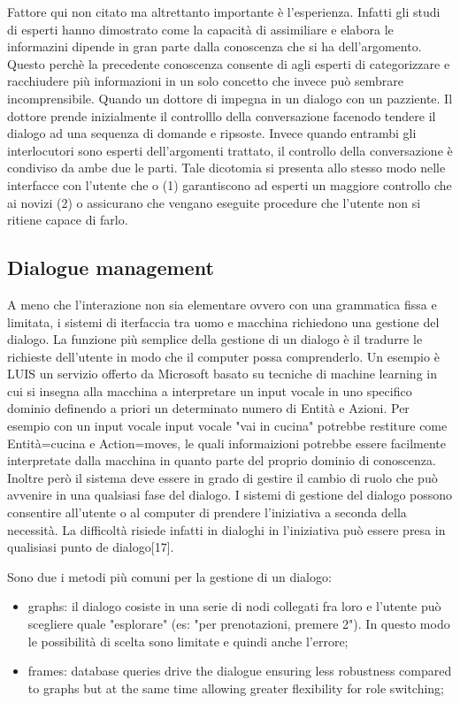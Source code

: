 \documentclass{thesisreport}
\begin{document}
 Fattore qui non citato ma altrettanto importante è l'esperienza. Infatti gli studi di esperti hanno dimostrato come la capacità di assimiliare e elabora le informazini dipende in gran parte dalla conoscenza che si ha dell'argomento. Questo perchè la precedente conoscenza consente di agli esperti di categorizzare e racchiudere più informazioni  in un solo concetto che invece può sembrare incomprensibile. 
 Quando un dottore di impegna in un dialogo con un pazziente. Il dottore prende inizialmente il controlllo della conversazione facenodo tendere il dialogo ad una sequenza di domande e ripsoste. Invece quando entrambi gli interlocutori sono esperti dell'argomenti trattato, il controllo della conversazione è condiviso da ambe due le parti. 
 Tale dicotomia si presenta allo stesso modo nelle interfacce con l'utente che o (1) garantiscono ad esperti un maggiore controllo che ai novizi (2) o assicurano che vengano eseguite procedure che l'utente non si ritiene capace di farlo. 
 
 \subsection{Dialogue management}
 A meno che l'interazione non sia elementare ovvero con una grammatica fissa e limitata, i sistemi di iterfaccia tra uomo e macchina richiedono una gestione del dialogo. 
 La funzione più semplice della gestione di un dialogo è il tradurre le richieste dell'utente in modo che il computer possa comprenderlo. Un esempio è LUIS un servizio offerto da Microsoft basato su tecniche di machine learning in cui si insegna alla macchina a interpretare un input vocale in uno specifico dominio definendo a priori un determinato numero di Entità e Azioni. Per esempio con un input vocale input vocale "vai in cucina" potrebbe restiture come Entità=cucina e Action=moves, le quali informaizioni potrebbe essere facilmente interpretate dalla macchina in quanto parte del proprio dominio di conoscenza. 
 Inoltre però il sistema deve essere in grado di gestire il cambio di ruolo che può avvenire in una qualsiasi fase del dialogo. I sistemi di gestione del dialogo possono consentire all'utente o al computer di prendere l'iniziativa a seconda della necessità. La difficoltà risiede infatti in dialoghi in l'iniziativa può essere presa in qualisiasi punto de dialogo[17].
 
 Sono due i metodi più comuni per la gestione di un dialogo:
 \begin{itemize}
     \item graphs: il dialogo cosiste in una serie di nodi collegati fra loro e l'utente può scegliere quale "esplorare" (es: "per prenotazioni, premere 2"). In questo modo le possibilità di scelta sono limitate e quindi anche l'errore;
     \item frames: database queries drive the dialogue ensuring less robustness compared to graphs but at the same time allowing greater flexibility for role switching;
 \end{itemize}
 
\end{document}
